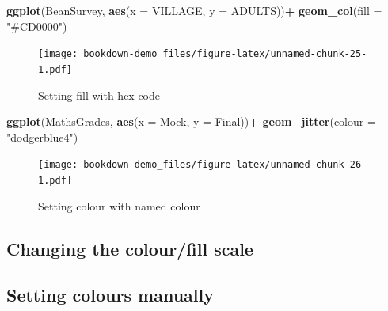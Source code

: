 \documentclass[
]{book}
\newenvironment{Shaded}{\begin{snugshade}}{\end{snugshade}}
\newcommand{\DataTypeTok}[1]{\textcolor[rgb]{0.13,0.29,0.53}{#1}}
\newcommand{\KeywordTok}[1]{\textcolor[rgb]{0.13,0.29,0.53}{\textbf{#1}}}
\newcommand{\NormalTok}[1]{#1}
\newcommand{\OperatorTok}[1]{\textcolor[rgb]{0.81,0.36,0.00}{\textbf{#1}}}
\newcommand{\StringTok}[1]{\textcolor[rgb]{0.31,0.60,0.02}{#1}}
\begin{document}
\begin{Shaded}
\begin{Highlighting}[]
\KeywordTok{ggplot}\NormalTok{(BeanSurvey, }\KeywordTok{aes}\NormalTok{(}\DataTypeTok{x =}\NormalTok{ VILLAGE, }\DataTypeTok{y =}\NormalTok{ ADULTS))}\OperatorTok{+}
\StringTok{  }\KeywordTok{geom_col}\NormalTok{(}\DataTypeTok{fill =} \StringTok{"#CD0000"}\NormalTok{)}
\end{Highlighting}
\end{Shaded}

\begin{figure}
\centering
\texttt{[image: bookdown-demo\_files/figure-latex/unnamed-chunk-25-1.pdf]}
\caption{\label{fig:unnamed-chunk-25}Setting fill with hex code}
\end{figure}

\begin{Shaded}
\begin{Highlighting}[]
\KeywordTok{ggplot}\NormalTok{(MathsGrades, }\KeywordTok{aes}\NormalTok{(}\DataTypeTok{x =}\NormalTok{ Mock, }\DataTypeTok{y =}\NormalTok{ Final))}\OperatorTok{+}
\StringTok{  }\KeywordTok{geom_jitter}\NormalTok{(}\DataTypeTok{colour =} \StringTok{"dodgerblue4"}\NormalTok{)}
\end{Highlighting}
\end{Shaded}

\begin{figure}
\centering
\texttt{[image: bookdown-demo\_files/figure-latex/unnamed-chunk-26-1.pdf]}
\caption{\label{fig:unnamed-chunk-26}Setting colour with named colour}
\end{figure}

\hypertarget{changing-the-colourfill-scale}{%
\subsection{Changing the colour/fill scale}\label{changing-the-colourfill-scale}}

\hypertarget{setting-colours-manually}{%
\subsection{Setting colours manually}\label{setting-colours-manually}}

  
\end{document}
